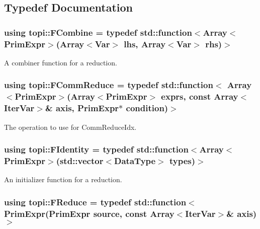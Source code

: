 \subsection{Typedef Documentation}
\subsubsection[{\texorpdfstring{F\+Combine}{FCombine}}]{\setlength{\rightskip}{0pt plus 5cm}using {\bf topi\+::\+F\+Combine} = typedef std\+::function$<${\bf Array}$<${\bf Prim\+Expr}$>$({\bf Array}$<${\bf Var}$>$ lhs, {\bf Array}$<${\bf Var}$>$ rhs)$>$}\hypertarget{namespacetopi_afa9b3b014bd552948f6fd671465901fa}{}\label{namespacetopi_afa9b3b014bd552948f6fd671465901fa}


A combiner function for a reduction. 

\subsubsection[{\texorpdfstring{F\+Comm\+Reduce}{FCommReduce}}]{\setlength{\rightskip}{0pt plus 5cm}using {\bf topi\+::\+F\+Comm\+Reduce} = typedef std\+::function$<$ {\bf Array}$<${\bf Prim\+Expr}$>$({\bf Array}$<${\bf Prim\+Expr}$>$ exprs, const {\bf Array}$<${\bf Iter\+Var}$>$\& axis, {\bf Prim\+Expr}$\ast$ condition)$>$}\hypertarget{namespacetopi_a8baac534d5ff12a20f089736a0e60f14}{}\label{namespacetopi_a8baac534d5ff12a20f089736a0e60f14}


The operation to use for Comm\+Reduce\+Idx. 

\subsubsection[{\texorpdfstring{F\+Identity}{FIdentity}}]{\setlength{\rightskip}{0pt plus 5cm}using {\bf topi\+::\+F\+Identity} = typedef std\+::function$<${\bf Array}$<${\bf Prim\+Expr}$>$(std\+::vector$<${\bf Data\+Type}$>$ types)$>$}\hypertarget{namespacetopi_a180676c7dc5c5716056719a58b60ca2c}{}\label{namespacetopi_a180676c7dc5c5716056719a58b60ca2c}


An initializer function for a reduction. 

\subsubsection[{\texorpdfstring{F\+Reduce}{FReduce}}]{\setlength{\rightskip}{0pt plus 5cm}using {\bf topi\+::\+F\+Reduce} = typedef std\+::function$<${\bf Prim\+Expr}({\bf Prim\+Expr} source, const {\bf Array}$<${\bf Iter\+Var}$>$\& axis)$>$}\hypertarget{namespacetopi_a4d0f5ddce836d926393ac3d154170ef6}{}\label{namespacetopi_a4d0f5ddce836d926393ac3d154170ef6}


